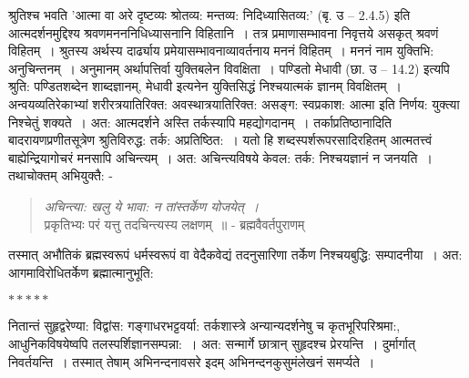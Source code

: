 {श्रुतिश्च भवति 'आत्मा वा अरे दृष्टव्यः श्रोतव्य: मन्तव्य: निदिध्यासितव्य:' (बृ. उ – 2.4.5) इति आत्मदर्शनमुद्दिश्य श्रवणमनननिधिध्यासनानि विहितानि~। तत्र प्रमाणासम्भावना निवृत्तये असकृत् श्रवणं विहितम्~। श्रुतस्य अर्थस्य दार्ढ्याय प्रमेयासम्भावनाव्यावर्तनाय मननं विहितम्~। मननं नाम युक्तिभि: अनुचिन्तनम्~। अनुमानम् अर्थापत्तिर्वा युक्तिबलेन विवक्षिता~। पण्डितो मेधावी (छा. उ – 14.2) इत्यपि श्रुति: पण्डितशब्देन शाब्दज्ञानम्, मेधावी इत्यनेन युक्तिसिद्धं निश्चयात्मकं ज्ञानम् विवक्षितम्~। अन्वयव्यतिरेकाभ्यां शरीरत्रयातिरिक्त: अवस्थात्रयातिरिक्त: असङ्ग: स्वप्रकाश: आत्मा इति निर्णय: युक्त्या निश्चेतुं शक्यते~। अत: आत्मदर्शने अस्ति तर्कस्यापि महद्योगदानम्~। तर्काप्रतिष्ठानादिति बादरायणप्रणीतसूत्रेण श्रुतिविरुद्ध: तर्क: अप्रतिष्ठित:~। यतो हि शब्दस्पर्शरूपरसादिरहितम् आत्मतत्त्वं बाह्येन्द्रियागोचरं मनसापि अचिन्त्यम्~। अत: अचिन्त्यविषये केवल: तर्क: निश्चयज्ञानं न जनयति~। तथाचोक्तम् अभियुक्तै: -
\begin{verse}
\textit{अचिन्त्या: खलु ये भावा: न तांस्तर्केण योजयेत्~। }\\
प्रकृतिभ्यः परं यत्तु तदचिन्त्यस्य लक्षणम्~॥ - ब्रह्मवैवर्तपुराणम्
\end{verse}
तस्मात् अभौतिकं ब्रह्मस्वरूपं धर्मस्वरूपं वा वेदैकवेद्यं तदनुसारिणा तर्केण निश्चयबुद्धि: सम्पादनीया~। अत: आगमाविरोधितर्केण ब्रह्मात्मानुभूति: 

\centerline{$*****$}

नितान्तं सुहृद्वरेण्या: विद्वांस: गङ्गाधरभट्टवर्या: तर्कशास्त्रे अन्यान्यदर्शनेषु च कृतभूरिपरिश्रमा:, आधुनिकविषयेष्वपि तलस्पर्शिज्ञानसम्पन्ना:~। अत: सन्मार्गे छात्रान् सुहृदश्च प्रेरयन्ति~। दुर्मार्गात् निवर्तयन्ति~। तस्मात् तेषाम् अभिनन्दनावसरे इदम् अभिनन्दनकुसुमं\break लेखनं समर्प्यते~। 

\articleend
}
